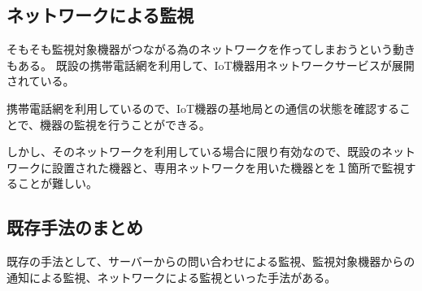 \subsection{ネットワークによる監視}
	そもそも監視対象機器がつながる為のネットワークを作ってしまおうという動きもある。
	既設の携帯電話網を利用して、IoT機器用ネットワークサービスが展開されている。

	携帯電話網を利用しているので、IoT機器の基地局との通信の状態を確認することで、機器の監視を行うことができる。

	しかし、そのネットワークを利用している場合に限り有効なので、既設のネットワークに設置された機器と、専用ネットワークを用いた機器とを１箇所で監視することが難しい。

\subsection{既存手法のまとめ}
	既存の手法として、サーバーからの問い合わせによる監視、監視対象機器からの通知による監視、ネットワークによる監視といった手法がある。





